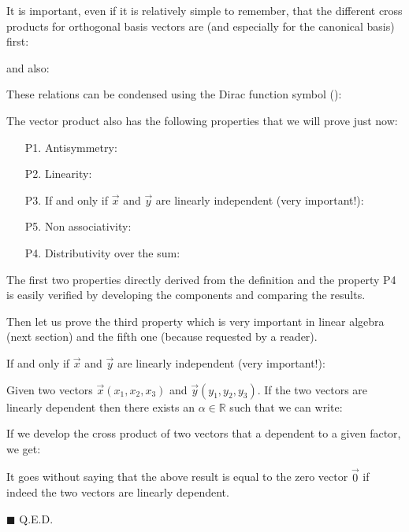 	\pagebreak
	It is important, even if it is relatively simple to remember, that the different cross products for orthogonal basis vectors are (and especially for the canonical basis) first:
	
	and also:
	
	These relations can be condensed using the Dirac function symbol\label{orthogonal basis} ():
	
	The vector product also has the following properties that we will prove just now:
	  \begin{enumerate}
	  	\item[P1.] Antisymmetry:
	  		
	  		
	  	\item[P2.] Linearity\label{cross product linearity}:
	  		
	  		
	  	\item[P3.] If and only if $\vec{x}$ and $\vec{y}$ are linearly independent (very important!):
	  	
	  	
	  	\item[P5.] Non associativity:
	  	
	  	
	  	\item[P4.] Distributivity over the sum:
	  	
	  \end{enumerate}
	  The first two properties directly derived from the definition and the property P4 is easily verified by developing the components and comparing the results.
	  
	 Then let us prove the third property which is very important in linear algebra (next section) and the fifth one (because requested by a reader).
	\begin{theorem}
	If and only if $\vec{x}$ and $\vec{y}$ are linearly independent (very important!):
	
	\end{theorem}
	\begin{dem}
	Given two vectors $\vec{x}(x_1,x_2,x_3)$ and $\vec{y}(y_1,y_2,y_3)$. If the two vectors are linearly dependent then there exists an $\alpha \in \mathbb{R}$ such that we can write:
	
	If we develop the cross product of two vectors that a dependent to a given factor, we get:
	
	It goes without saying that the above result is equal to the zero vector $\vec{0}$ if indeed the two vectors are linearly dependent.
	\begin{flushright}
		$\blacksquare$  Q.E.D.
	\end{flushright}
	\end{dem}
	
